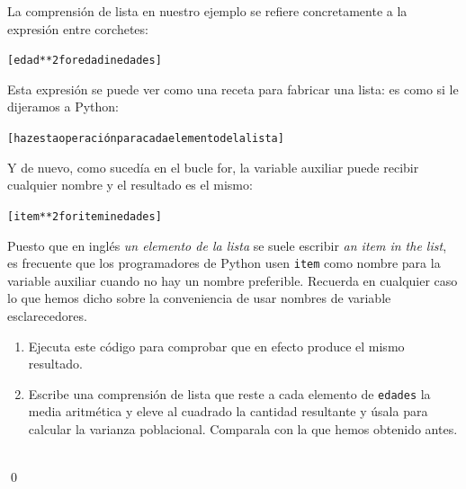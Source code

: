 \documentclass[10pt,a4paper]{article}\usepackage[]{graphicx}\usepackage[]{color}
\makeatletter
\newenvironment{kframe}{%
 \def\at@end@of@kframe{}%
 \ifinner\ifhmode%
  \def\at@end@of@kframe{\end{minipage}}%
  \begin{minipage}{\columnwidth}%
 \fi\fi%
 \def\FrameCommand##1{\hskip\@totalleftmargin \hskip-\fboxsep
 \colorbox{shadecolor}{##1}\hskip-\fboxsep
     \hskip-\linewidth \hskip-\@totalleftmargin \hskip\columnwidth}%
 \MakeFramed {\advance\hsize-\width
   \@totalleftmargin\z@ \linewidth\hsize
   \@setminipage}}%
 {\par\unskip\endMakeFramed%
 \at@end@of@kframe}
\newenvironment{knitrout}{}{} %
\makeatother
\begin{document}
La comprensión de lista en nuestro ejemplo se refiere concretamente a la expresión entre corchetes:
\begin{knitrout}
\color{fgcolor}\begin{kframe}
\begin{alltt}
[edad**2 for edad in edades]
\end{alltt}
\end{kframe}
\end{knitrout}
Esta expresión se puede ver como una receta para fabricar una lista: es como si le dijeramos a Python:
\begin{knitrout}
\color{fgcolor}\begin{kframe}
\begin{alltt}
[haz esta operación para cada elemento de la lista]
\end{alltt}
\end{kframe}
\end{knitrout}
Y de nuevo, como sucedía en el bucle for, la variable auxiliar puede recibir cualquier nombre y el resultado es el mismo:
\begin{knitrout}
\color{fgcolor}\begin{kframe}
\begin{alltt}
[item**2 for item in edades]
\end{alltt}
\end{kframe}
\end{knitrout}
Puesto que en inglés {\em un elemento de la lista} se suele escribir {\em an item in the list}, es frecuente que los programadores de Python usen {\tt item} como nombre para la variable auxiliar cuando no hay un nombre preferible. Recuerda en cualquier caso lo que hemos dicho sobre la conveniencia de usar nombres de variable esclarecedores.

\begin{ejercicio}
\label{tut02:ejercicio16}
\quad
\begin{enumerate}
\item Ejecuta este código para comprobar que en efecto produce el mismo resultado.
\item Escribe una comprensión de lista que reste a cada elemento de {\tt edades} la media aritmética y eleve al cuadrado la cantidad resultante y úsala para calcular la varianza poblacional. Comparala con la que hemos obtenido antes.
\end{enumerate}
\quad\\
\qed
\end{ejercicio}
\end{document}
